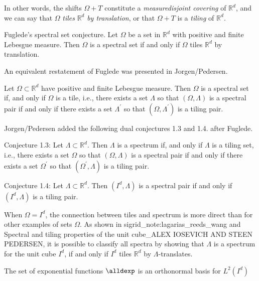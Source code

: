 In other words, the shifts $\Omega + T$ constitute a \emph{measuredisjoint covering} of $\mathbb{R}^d$, and we can say that $\Omega$ \emph{tiles} $\mathbb{R}^d$ \emph{by translation}, or that $\Omega+T$ is a \emph{tiling} of $\mathbb{R}^d$.





Fuglede's spectral set conjecture. Let $\Omega$ be a set in $\mathbb{R}^d$ with positive and finite Lebesgue measure. Then $\Omega$ is a spectral set if and only if $\Omega$ tiles $\mathbb{R}^d$ by translation.

An equivalent restatement of Fuglede was presented in Jorgen/Pedersen. 

Let $\Omega \subset \mathbb{R}^d$ have positive and finite Lebesgue measure. Then $\Omega$ is a spectral set if, and only if $\Omega$ is a tile, i.e., there exists a set $\Lambda$ so that $(\Omega, \Lambda)$ is a spectral pair if and only if there exists a set $\Lambda^{\prime}$ so that $\left(\Omega, \Lambda^{\prime}\right)$ is a tiling pair.


Jorgen/Pedersen added the following dual conjectures 1.3 and 1.4. after Fuglede.


Conjecture 1.3: Let $\Lambda \subset \mathbb{R}^d$. Then $\Lambda$ is a spectrum if, and only if $\Lambda$ is a tiling set, i.e., there exists a set $\Omega$ so that $(\Omega, \Lambda)$ is a spectral pair if and only if there exists a set $\Omega^{\prime}$ so that $\left(\Omega^{\prime}, \Lambda\right)$ is a tiling pair.

Conjecture 1.4: Let $\Lambda \subset \mathbb{R}^d$. Then $\left(I^d, \Lambda\right)$ is a spectral pair if and only if $\left(I^d, \Lambda\right)$ is a tiling pair.

When $\Omega = I^d$, the connection between tiles and spectrum is more direct than for other examples of sets $\Omega$. As shown in sigrid_note:lagarias_reeds_wang and Spectral and tiling properties of the unit cube_ALEX IOSEVICH AND STEEN PEDERSEN, it is possible to classify all spectra by showing that $\Lambda$ is a spectrum for the unit cube $I^d$, if and only if $I^d$ tiles $\mathbb{R}^d$ by $\Lambda$-translates.


\begin{lemma}
    The set of exponential functions $\alldexp$ is an orthonormal basis for $L^2(I^d)$
\end{lemma}

